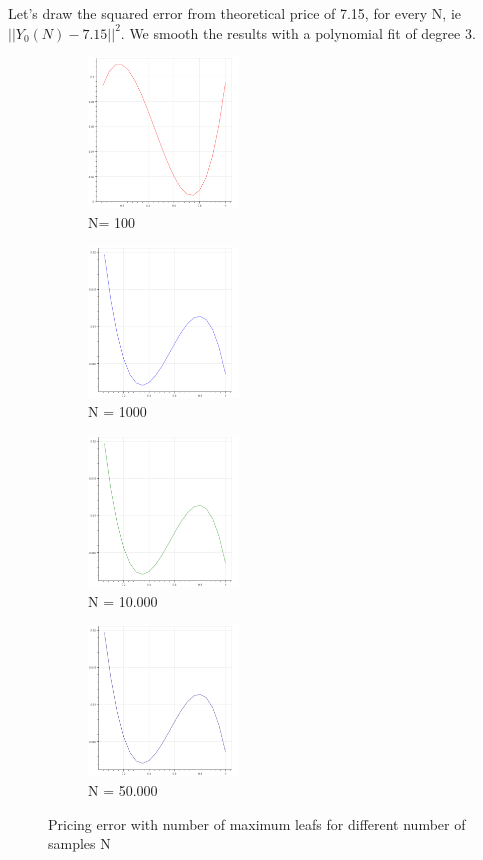 \documentclass[english,11pt,openany]{report}
\theoremstyle{definition}
\theoremstyle{plain}
\theoremstyle{definition}
\begin{document}
Let's draw the squared error from theoretical price of 7.15, for every N, ie 
\newline
$||Y_0(N) - 7.15||^2$. 
We smooth the results with a polynomial fit of degree 3. 

\begin{figure}[H]
	\centering
	\begin{subfigure}[t]{0.3\textwidth}
		\includegraphics[width=40mm]{RF_analysis/n_100.png}
		\caption{N= 100}
		\label{fig:a} %
	\end{subfigure}
	\begin{subfigure}[t]{0.3\textwidth}
		\includegraphics[width=40mm]{RF_analysis/n_1000.png}
		\caption{N = 1000}
		\label{fig:b}
	\end{subfigure}


	\begin{subfigure}[t]{0.3\textwidth}
		\includegraphics[width=40mm]{RF_analysis/n_10000.png}
		\caption{N = 10.000}
		\label{fig:c}
	\end{subfigure}	
	\begin{subfigure}[t]{0.3\textwidth}
		\includegraphics[width=40mm]{RF_analysis/n_50000.png}
		\caption{N = 50.000}
		\label{fig:d}
	\end{subfigure}
\caption{Pricing error with number of maximum leafs for different number of samples N}
\end{figure}
\end{document}
